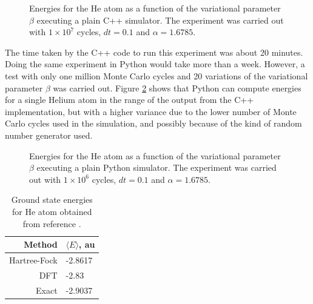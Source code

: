 \begin{figure}
\centering
\scalebox{0.75}{}
\caption{Energies for the He atom as a function of the variational parameter $\beta$ executing a plain C++ simulator. The experiment was carried out with $1\times 10^{7}$ cycles, $dt=0.1$ and $\alpha = 1.6785$.}
\label{energyHePlainCpp}
\end{figure}
\noindent
The time taken by the C++ code to run this experiment was about 20 minutes. Doing the same experiment in Python would take more than a week. However, a test with only one million Monte Carlo cycles and 20 variations of the variational parameter $\beta$ was carried out. Figure \ref{energyHePlainPy} shows that  Python can compute energies for a single Helium atom in the range of the output from the C++ implementation, but with a higher variance due to the lower number of Monte Carlo cycles used in the simulation, and possibly because of the kind of random number generator used.\\

\begin{figure}
\centering
\scalebox{0.75}{}
\caption{Energies for the He atom as a function of the variational parameter $\beta$ executing a plain Python simulator. The experiment was carried out with $1\times 10^{6}$ cycles, $dt=0.1$ and $\alpha = 1.6785$.}
\label{energyHePlainPy}
\end{figure}

\begin{table}
\centering
\begin{tabular}{rl}
\toprule[1pt]
\textbf{Method} & \textbf{$\langle E \rangle$}, au \\
\midrule[1pt]
Hartree-Fock	 & -2.8617 \\
DFT						 & -2.83 \\
Exact					 & -2.9037\\
\bottomrule[1pt]
\end{tabular}\caption{Ground state energies for He atom obtained from reference \cite{Thijssen}.}
\label{energiesHePythonVsRef}
\end{table}


